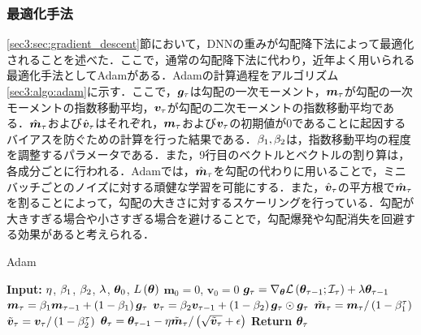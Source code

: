 \subsubsection{最適化手法}
\label{sec3:sec:optimizer}
\ref{sec3:sec:gradient_descent}節において，DNNの重みが勾配降下法によって最適化されることを述べた．ここで，通常の勾配降下法に代わり，近年よく用いられる最適化手法としてAdam\cite{kingma2014adam}がある．Adamの計算過程をアルゴリズム\ref{sec3:algo:adam}に示す．ここで，$\bm{g}_{\tau}$は勾配の一次モーメント，$\bm{m}_{\tau}$が勾配の一次モーメントの指数移動平均，$\bm{v}_{\tau}$が勾配の二次モーメントの指数移動平均である．$\hat{\bm{m}}_{\tau}$および$\hat{\bm{v}}_{\tau}$はそれぞれ，$\bm{m}_{\tau}$および$\bm{v}_{\tau}$の初期値が0であることに起因するバイアスを防ぐための計算を行った結果である．$\beta_{1}, \beta_{2}$は，指数移動平均の程度を調整するパラメータである．また，9行目のベクトルとベクトルの割り算は，各成分ごとに行われる．Adamでは，$\hat{\bm{m}}_{\tau}$を勾配の代わりに用いることで，ミニバッチごとのノイズに対する頑健な学習を可能にする．また，$\hat{\bm{v}}_{\tau}$の平方根で$\hat{\bm{m}}_{\tau}$を割ることによって，勾配の大きさに対するスケーリングを行っている．勾配が大きすぎる場合や小さすぎる場合を避けることで，勾配爆発や勾配消失を回避する効果があると考えられる．
\begin{algorithm}
    \caption{Adam}
    \label{sec3:algo:adam}
    \begin{algorithmic}[1]
        \State \textbf{Input:} $\eta$, $\beta_{1}$, $\beta_{2}$, $\lambda$, $\bm{\theta}_{0}$, $L\left(\bm{\theta}\right)$
        \State $\bm{m}_{0} = 0$, $\bm{v}_{0} = 0$
        \State $\bm{g}_{\tau} = \nabla_{\bm{\theta}} \mathcal{L}\left(\bm{\theta}_{\tau - 1}; \mathcal{I}_{\tau}\right) + \lambda \bm{\theta}_{\tau-1}$
        \State $\bm{m}_{\tau} = \beta_{1} \bm{m}_{\tau-1} + \left(1 - \beta_{1}\right) \bm{g}_{\tau}$
        \State $\bm{v}_{\tau} = \beta_{2} \bm{v}_{\tau-1} + \left(1 - \beta_{2}\right) \bm{g}_{\tau} \odot \bm{g}_{\tau}$
        \State $\tilde{\bm{m}}_{\tau} = \bm{m}_{\tau} / \left(1 - \beta_{1}^{\tau}\right)$
        \State $\tilde{\bm{v}}_{\tau} = \bm{v}_{\tau} / \left(1 - \beta_{2}^{\tau}\right)$
        \State $\bm{\theta}_{\tau} = \bm{\theta}_{\tau-1} - \eta \tilde{\bm{m}}_{\tau} / \left(\sqrt{\tilde{\bm{v}}_{\tau}} + \epsilon\right)$
        \EndFor
        \State \textbf{Return} $\bm{\theta}_{\tau}$
    \end{algorithmic}
\end{algorithm}
